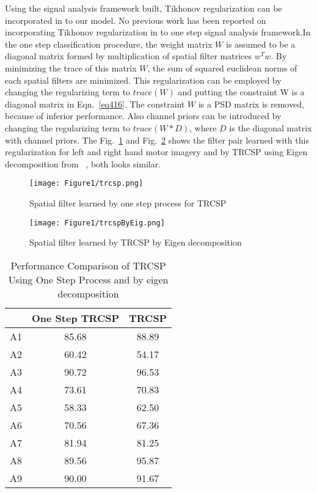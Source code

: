 Using the signal analysis framework built, Tikhonov regularization can be incorporated in to our model. No previous work has been reported on incorporating Tikhonov regularization in to one step signal analysis framework.In the one step classification procedure, the weight matrix $W$ is assumed to be a diagonal matrix formed by multiplication of spatial filter matrices $w^T w$. By minimizing the trace of this matrix $W$, the sum of squared euclidean norms of each spatial filters are minimized. This regularization can be employed by changing the regularizing term to $trace(W)$ and putting the constraint W is a diagonal matrix in Eqn.~\ref{eq416}. The constraint $W$ is a PSD matrix is removed, because of inferior performance. Also channel priors can be introduced by changing the regularizing term to $trace(W*D)$, where $D$ is the diagonal matrix with channel priors. The Fig.~\ref{alp2} and Fig.~\ref{eigtrcsp} shows the filter pair learned with this regularization for left and right hand motor imagery and by TRCSP using Eigen decomposition from ~\cite{34}, both looks similar.
\begin{figure}[hbtp]
\centering
\texttt{[image: Figure1/trcsp.png]}
\caption{Spatial filter learned by one step process for TRCSP}
\label{alp2}
\end{figure}

\begin{figure}[hbtp]
\centering
\texttt{[image: Figure1/trcspByEig.png]}
\caption{Spatial filter learned by TRCSP by Eigen decomposition}
\label{eigtrcsp}
\end{figure}

\begin{table}
\centering
\caption {Performance Comparison of TRCSP Using One Step Process and by eigen decomposition}
    \begin{tabular}{|c|c|c|}
    \hline
    ~  & One Step TRCSP   & TRCSP \\ \hline
    A1 & 85.68 & 88.89 \\ \hline
    A2 & 60.42 & 54.17 \\ \hline
    A3 & 90.72 & 96.53 \\ \hline
    A4 & 73.61 & 70.83 \\ \hline
    A5 & 58.33 & 62.50 \\ \hline
    A6 & 70.56 & 67.36 \\ \hline
    A7 & 81.94 & 81.25 \\ \hline
    A8 & 89.56 & 95.87 \\ \hline
    A9 & 90.00 & 91.67 \\ \hline
    \end{tabular}
    \label{tabcomp}
\end{table}

